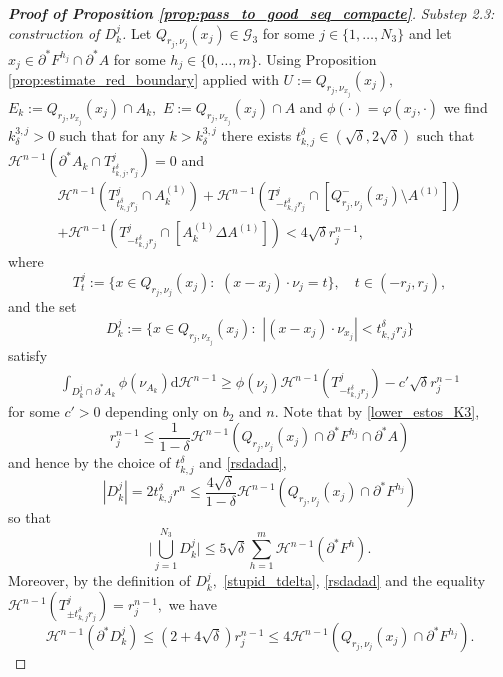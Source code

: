 \documentclass[reqno]{amsart}
\numberwithin{equation}{section}
\theoremstyle{plain}
\theoremstyle{definition}
\newcommand{\cH}{\mathcal{H}}
\newcommand{\cG}{\mathcal{G}}
\newcommand{\p}{\partial}
\newcommand{\bound}{b}
\renewcommand{\d}{\mathrm{d}}
\begin{document}
\begin{proof}[\textbf{Proof of Proposition \ref{prop:pass_to_good_seq_compacte}}]
{\it Substep 2.3: construction of $D_k^j$.} Let $Q_{r_j,\nu_j}(x_j) \in\cG_3$ for some $j\in \{1,\ldots,N_3\}$ and let $x_j\in \p^*F^{h_j}\cap\p^*A$ for some $h_j\in\{0,\ldots,m\}.$ Using Proposition \ref{prop:estimate_red_boundary} applied with $U:=Q_{r_j,\nu_{x_j}}(x_j),$ $E_k:=Q_{r_j,\nu_{x_j}}(x_j) \cap A_k,$ $E:=Q_{r_j,\nu_{x_j}}(x_j)\cap A$ and $\phi(\cdot)=\varphi(x_j,\cdot)$ we find $k_\delta^{3,j} > 0$ such that for any $k > k_\delta^{3,j}$ there exists $t_{k,j}^\delta\in(\sqrt{\delta},2\sqrt{\delta})$ such that $\cH^{n-1}(\p^*A_k\cap T_{t_{k,j}^\delta,r_j}^j) = 0$ and
\begin{multline}\label{stupid_tdelta}
\cH^{n-1}( T_{t_{k,j}^\delta r_j}^j\cap A_k^{(1)}) + \cH^{n-1}( T_{-t_{k,j}^\delta r_j}^j\cap  [Q_{r_j,\nu_j}^-(x_j)\setminus  A^{(1)}]) \\
  + \cH^{n-1}( T_{-t_{k,j}^\delta r_j}^j\cap [A_k^{(1)}\Delta A^{(1)}]) <4\sqrt{\delta}r_j^{n-1},
\end{multline}
where 
$$
 T_t^j:=\{x\in Q_{r_j,\nu_j}(x_j):\,\, (x-x_j)\cdot \nu_j=t\},\quad t\in(-r_j,r_j),
$$
and the set 
$$
D_k^j:=\{x\in Q_{r_j,\nu_{x_j}}(x_j):\,\,|(x-x_j)\cdot\nu_{x_j}|<t_{k,j}^\delta r_j\}
$$
satisfy 
\begin{align}\label{yalililalala}
\int_{D_k^j\cap \p^*A_k} \phi(\nu_{A_k})\d\cH^{n-1} 
\ge \phi(\nu_j)\cH^{n-1}( T_{-t_{k,j}^\delta r_j}^j )
- c'\sqrt{\delta}r_j^{n-1}
\end{align}
for some $c'>0$ depending only on $\bound_2$ and $n.$ Note that by \eqref{lower_estos_K3},
\begin{equation}\label{rsdadad}
r_j^{n-1} \le \frac{1}{1-\delta}\cH^{n-1}(Q_{r_j,\nu_j}(x_j) \cap \p^*F^{h_j}\cap \p^*A) 
\end{equation}
and hence by the choice of $t_{k,j}^\delta$ and \eqref{rsdadad},
$$
|D_k^j|=2t_{k,j}^\delta r^n\le \frac{4\sqrt{\delta}}{1-\delta} \cH^{n-1}(Q_{r_j,\nu_j}(x_j)\cap \p^*F^{h_j}) 
$$
so that
\begin{equation}\label{tot_volest_K4}
\Big|\bigcup_{j=1}^{N_3} D_k^j\Big| \le 5\sqrt{\delta}\sum\limits_{h=1}^m\cH^{n-1}(\p^*F^h). 
\end{equation}
Moreover, by the definition of $D_k^j,$ \eqref{stupid_tdelta}, \eqref{rsdadad} and the equality $\cH^{n-1}( T_{\pm t_{k,j}^\delta r_j}^j ) = r_j^{n-1},$ we have
\begin{equation}\label{per_Dkj_opopa}
\cH^{n-1}(\p^*D_k^j) \le (2+4\sqrt{\delta})r_j^{n-1}\le 4\cH^{n-1}(Q_{r_j,\nu_j}(x_j) \cap \p^*F^{h_j}). 
\end{equation}
%


\end{proof}
\end{document}
